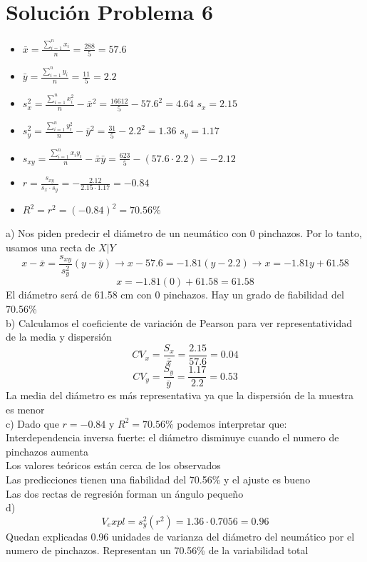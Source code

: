 \documentclass[fleqn]{article}
\begin{document}
	\section{Solución Problema 6}
	\begin{itemize}
		\item $\bar{x} = \frac{\sum_{i=1}^n x_i}{n} = \frac{288}{5} = 57.6$
		\item $\bar{y} = \frac{\sum_{i=1}^n y_i}{n} = \frac{11}{5} = 2.2$ 
		\item $s_x^{2} = \frac{\sum_{i=1}^n x_i^{2}}{n} - \bar{x}^{2} = \frac{16612}{5} - 57.6^{2} = 4.64$ $s_x = 2.15$
		\item $s_y^{2} = \frac{\sum_{i=1}^n y_i^{2}}{n} - \bar{y}^{2} = \frac{31}{5} - 2.2^{2} = 1.36$ $s_y = 1.17$
		\item $s_{xy} = \frac{\sum_{i=1}^n x_i y_i}{n} - \bar{x} \bar{y} = \frac{623}{5} - (57.6 \cdot 2.2) = -2.12$
		\item $r = \frac{s_{xy}}{s_x \cdot s_y} = -\frac{2.12}{2.15 \cdot 1.17} = -0.84$
		\item $R^2 = r^2 = (-0.84)^{2} = 70.56\%$
	\end{itemize}
	a) Nos piden predecir el diámetro de un neumático con 0 pinchazos. Por lo tanto, usamos una recta de $X | Y$
	\[
	x - \bar{x} = \frac{s_{xy}}{s_y^{2}} (y - \bar{y}) \rightarrow x - 57.6 = -1.81(y - 2.2) \rightarrow x = -1.81y + 61.58
	\]
	\[
	x = -1.81(0) + 61.58 = 61.58
	\]
	El diámetro será de 61.58 cm con 0 pinchazos. Hay un grado de fiabilidad del 70.56\% \\
	b) Calculamos el coeficiente de variación de Pearson para ver representatividad de la media y dispersión
	\[
	CV_x = \frac{S_x}{\bar{x}} = \frac{2.15}{57.6} = 0.04
	\] 
	\[
	CV_y = \frac{S_y}{\bar{y}} = \frac{1.17}{2.2} = 0.53
	\]
	La media del diámetro es más representativa ya que la dispersión de la muestra es menor \\
	c) Dado que $r = -0.84$ y $R^2 = 70.56\%$ podemos interpretar que: \\
	Interdependencia inversa fuerte: el diámetro disminuye cuando el numero de pinchazos aumenta \\
	Los valores teóricos están cerca de los observados \\
	Las predicciones tienen una fiabilidad del 70.56\% y el ajuste es bueno \\
	Las dos rectas de regresión forman un ángulo pequeño \\
	d)
	\[
	V_expl = s_y^2 (r^2) = 1.36 \cdot 0.7056 = \boxed{0.96} 
	\]
	Quedan explicadas 0.96 unidades de varianza del diámetro del neumático por el numero de pinchazos. Representan un 70.56\% de la variabilidad total \\
\end{document}

